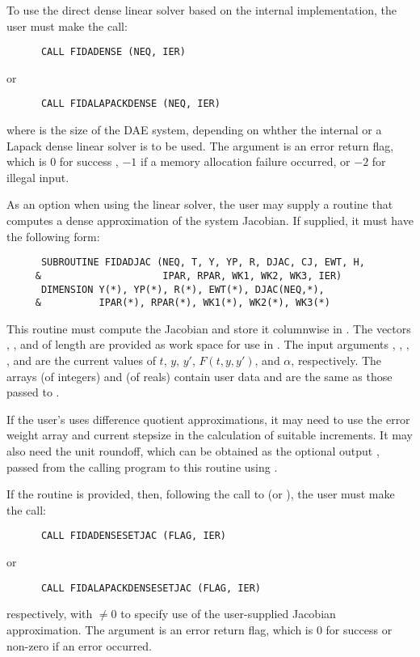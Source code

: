 \begin{Steps}
  To use the direct dense linear solver based on the internal {\ida}
  implementation, the user must make the call:
\begin{verbatim}
      CALL FIDADENSE (NEQ, IER)
\end{verbatim}
  or
\begin{verbatim}
      CALL FIDALAPACKDENSE (NEQ, IER)
\end{verbatim}
  where  is the size of the DAE system, depending on whther the internal
  or a Lapack dense linear solver is to be used.
  The argument  is an error return flag, which is $0$ 
  for success , $-1$ if a memory allocation failure occurred, or $-2$ for illegal input.

  As an option when using the {\dense} linear solver, the user may supply a
  routine that computes a dense approximation of the system Jacobian. If supplied,
  it must have the following form:
\begin{verbatim}
      SUBROUTINE FIDADJAC (NEQ, T, Y, YP, R, DJAC, CJ, EWT, H,
     &                     IPAR, RPAR, WK1, WK2, WK3, IER)
      DIMENSION Y(*), YP(*), R(*), EWT(*), DJAC(NEQ,*), 
     &          IPAR(*), RPAR(*), WK1(*), WK2(*), WK3(*)
\end{verbatim}
  This routine must compute the Jacobian and store it columnwise in .
  The vectors , , and  of length  are provided
  as work space for use in .
  The input arguments , , , , and  are the
  current values of $t$, $y$, $y'$, $F(t,y,y')$, and $\alpha$, respectively.
  The arrays  (of integers) and  (of reals) contain user data
  and are the same as those passed to .
  
  If the user's  uses difference quotient approximations, it
  may need to use the error weight array  and current stepsize 
  in the calculation of suitable increments.  It may also need the unit
  roundoff, which can be obtained as the optional output ,
  passed from the calling program to this routine using .

  If the  routine is provided, then, following the call to  
  (or ), the user must make the call:
\begin{verbatim}
      CALL FIDADENSESETJAC (FLAG, IER)
\end{verbatim}
  or
\begin{verbatim}
      CALL FIDALAPACKDENSESETJAC (FLAG, IER)
\end{verbatim}
  respectively, with  $\neq 0$ to specify use of the user-supplied Jacobian
  approximation.  The argument  is an error return flag, which is $0$ 
  for success or non-zero if an error occurred.
  

\end{Steps}

